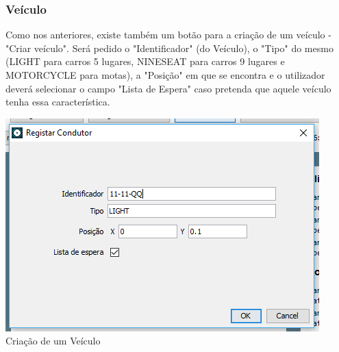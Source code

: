 \documentclass[a4paper]{article}
\begin{document}
\subsubsection{Veículo}
Como nos anteriores, existe também um botão para a criação de um veículo - "Criar veículo". Será pedido o "Identificador" (do Veículo), o "Tipo" do mesmo (LIGHT para carros 5 lugares, NINESEAT para carros 9 lugares e MOTORCYCLE para motas), a "Posição" em que se encontra e o utilizador deverá selecionar o campo "Lista de Espera" caso pretenda que aquele veículo tenha essa característica.
\begin{center}
  \includegraphics[scale=0.75]{criar_veiculo}\\
  \caption{Criação de um Veículo}
  \label{fig:picture}
\end{center}
\end{document}
